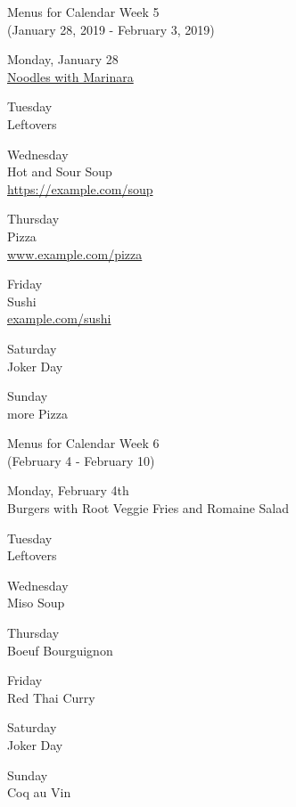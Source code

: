 \documentclass[12pt, parskip=full*]{scrreprt}
\begin{document}
\begin{center}
{\Large Menus for Calendar Week 5} \\
{\small (January 28, 2019 - February 3, 2019)}

{\calligra \Large Monday, January 28} \\
\href{https://example.com/noodles.html}{Noodles with Marinara}

{\calligra \Large Tuesday} \\
Leftovers

{\calligra \Large Wednesday} \\
Hot and Sour Soup\\
\url{https://example.com/soup}

{\calligra \Large Thursday} \\
Pizza\\
	\url{www.example.com/pizza}

{\calligra \Large Friday} \\
Sushi\\
	\url{example.com/sushi}

{\calligra \Large Saturday} \\
Joker Day

{\calligra \Large Sunday} \\
more Pizza
\newpage

{\Large Menus for Calendar Week 6} \\ 
{\small (February 4 - February 10)}

{\calligra \Large Monday, February 4th} \\
Burgers with Root Veggie Fries and Romaine Salad

{\calligra \Large Tuesday} \\
Leftovers

{\calligra \Large Wednesday} \\
Miso Soup

{\calligra \Large Thursday} \\
Boeuf Bourguignon

{\calligra \Large Friday} \\
Red Thai Curry

{\calligra \Large Saturday} \\
Joker Day

{\calligra \Large Sunday} \\
Coq au Vin

\end{center}
\end{document}
